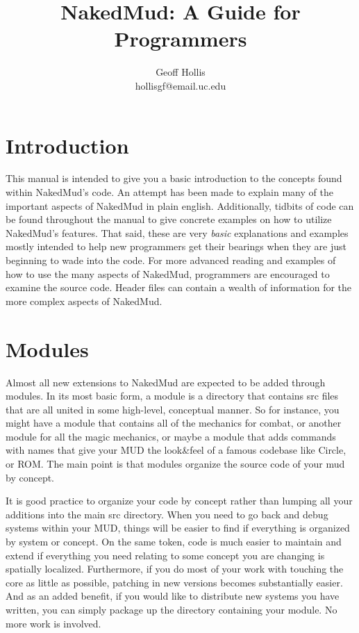 \documentclass[fignum,doc]{article}
\title{NakedMud: A Guide for Programmers}
\author{Geoff Hollis \\ hollisgf@email.uc.edu}
\begin{document}
\maketitle
\newpage
\tableofcontents
\newpage



\begin{doublespace}
\section{Introduction}
This manual is intended to give you a basic introduction to the concepts found within NakedMud's code. An attempt has been made to explain many of the important aspects of NakedMud in plain english. Additionally, tidbits of code can be found throughout the manual to give concrete examples on how to utilize NakedMud's features. That said, these are very {\it basic} explanations and examples mostly intended to help new programmers get their bearings when they are just beginning to wade into the code. For more advanced reading and examples of how to use the many aspects of NakedMud, programmers are encouraged to examine the source code. Header files can contain a wealth of information for the more complex aspects of NakedMud.



\section{Modules}
Almost all new extensions to NakedMud are expected to be added through modules. In its most basic form, a module is a directory that contains src files that are all united in some high-level, conceptual manner. So for instance, you might have a module that contains all of the mechanics for combat, or another module for all the magic mechanics, or maybe a module that adds commands with names that give your MUD the look\&feel of a famous codebase like Circle, or ROM. The main point is that modules organize the source code of your mud by concept.

It is good practice to organize your code by concept rather than lumping all your additions into the main src directory. When you need to go back and debug systems within your MUD, things will be easier to find if everything is organized by system or concept. On the same token, code is much easier to maintain and extend if everything you need relating to some concept you are changing is spatially localized. Furthermore, if you do most of your work with touching the core as little as possible, patching in new versions becomes substantially easier. And as an added benefit, if you would like to distribute new systems you have written, you can simply package up the directory containing your module. No more work is involved.


\end{doublespace}
\end{document}
